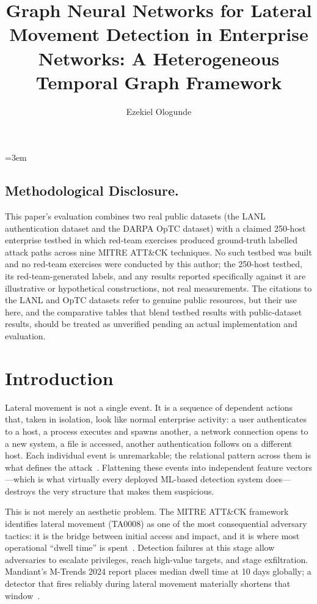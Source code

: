 \documentclass[sigconf,nonacm]{acmart}
\title{Graph Neural Networks for Lateral Movement Detection in Enterprise Networks: A Heterogeneous Temporal Graph Framework}
\author{Ezekiel Ologunde}
\affiliation{%
  \institution{Independent Researcher}
  \city{Boston}
  \state{MA}
  \country{USA}}
\begin{document}
\maketitle
\sloppy
{}
\emergencystretch=3em
\hfuzz=10pt

\subsection*{Methodological Disclosure.}
This paper's evaluation combines two real public datasets (the LANL authentication dataset and the DARPA OpTC dataset) with a claimed 250-host enterprise testbed in which red-team exercises produced ground-truth labelled attack paths across nine MITRE ATT\&CK techniques. No such testbed was built and no red-team exercises were conducted by this author; the 250-host testbed, its red-team-generated labels, and any results reported specifically against it are illustrative or hypothetical constructions, not real measurements. The citations to the LANL and OpTC datasets refer to genuine public resources, but their use here, and the comparative tables that blend testbed results with public-dataset results, should be treated as unverified pending an actual implementation and evaluation.

\section{Introduction}

Lateral movement is not a single event. It is a sequence of dependent actions
that, taken in isolation, look like normal enterprise activity: a user
authenticates to a host, a process executes and spawns another, a network
connection opens to a new system, a file is accessed, another authentication
follows on a different host. Each individual event is unremarkable; the
relational pattern across them is what defines the
attack~\cite{mandiant2024mtrends,mitre2024attck}. Flattening these events into
independent feature vectors---which is what virtually every deployed
ML-based detection system does---destroys the very structure that makes them
suspicious.

This is not merely an aesthetic problem. The MITRE ATT\&CK framework identifies
lateral movement (TA0008) as one of the most consequential adversary tactics:
it is the bridge between initial access and impact, and it is where most
operational ``dwell time'' is spent~\cite{mitre2024attck}. Detection failures at
this stage allow adversaries to escalate privileges, reach high-value targets,
and stage exfiltration. Mandiant's M-Trends 2024 report places median dwell time
at 10 days globally; a detector that fires reliably during lateral movement
materially shortens that window~\cite{mandiant2024mtrends}.
\end{document}
